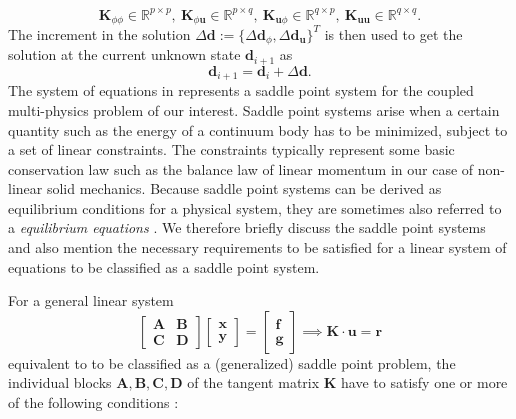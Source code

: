 \documentclass[11pt,a4paper,final]{article}
\begin{document}
\begin{equation}
\mathbf{K}_{\phi \phi} \in \mathbb{R}^{p \times p}, \ \mathbf{K}_{\phi \mathbf{u}} \in \mathbb{R}^{p \times q}, \ \mathbf{K}_{\mathbf{u} \phi} \in \mathbb{R}^{q \times p}, \ \mathbf{K}_{\mathbf{u} \mathbf{u}} \in \mathbb{R}^{q \times q}.
\end{equation}
The increment in the solution $\Delta \mathbf{d} := \{ \Delta \mathbf{d}_{\phi}, \Delta \mathbf{d}_{\mathbf{u}} \}^T$ is then used to get the solution at the current unknown state $\mathbf{d}_{i+1}$ as
\begin{equation}
\mathbf{d}_{i+1} = \mathbf{d}_i + \Delta \mathbf{d}.
\end{equation} 
The system of equations in  represents a saddle point system for the coupled multi-physics problem of our interest. Saddle point systems arise when a certain quantity such as the energy of a continuum body has to be minimized, subject to a set of linear constraints. The constraints typically represent some basic conservation law such as the balance law of linear momentum in our case of non-linear solid mechanics. Because saddle point systems can be derived as equilibrium conditions for a physical system, they are sometimes also referred to a \textit{equilibrium equations} \cite{Benzi2005}. We therefore briefly discuss the saddle point systems and also mention the necessary requirements to be satisfied for a linear system of equations to be classified as a saddle point system. \newline \par 
For a general linear system 
\begin{equation}
\begin{bmatrix}
\mathbf{A} & \mathbf{B} \\
\mathbf{C} & \mathbf{D}
\end{bmatrix}
\begin{bmatrix}
\mathbf{x} \\
\mathbf{y}
\end{bmatrix}
=
\begin{bmatrix}
\mathbf{f} \\
\mathbf{g}
\end{bmatrix}
\implies \mathbf{K} \cdot \mathbf{u} = \mathbf{r}
\label{eq:3.11}
\end{equation}
equivalent to  to be classified as a (generalized) saddle point problem, the individual blocks $\mathbf{A}, \mathbf{B}, \mathbf{C}, \mathbf{D}$ of the tangent matrix $\mathbf{K}$ have to satisfy one or more of the following conditions \cite{Benzi2005}:
\end{document}
